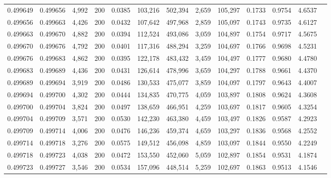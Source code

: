 \begin{tabular}{rrrrrrrrrrrrr}
0.499649 & 0.499656 &  4,992 & 200 &                                     0.0385 & 103,216 & 502,394 &   2,659 & 105,297 & 0.1733 & 0.9754 & 4.6537 \\
0.499656 & 0.499663 &  4,426 & 200 &                                     0.0432 & 107,642 & 497,968 &   2,859 & 105,097 & 0.1743 & 0.9735 & 4.6127 \\
0.499663 & 0.499670 &  4,882 & 200 &                                     0.0394 & 112,524 & 493,086 &   3,059 & 104,897 & 0.1754 & 0.9717 & 4.5675 \\
0.499670 & 0.499676 &  4,792 & 200 &                                     0.0401 & 117,316 & 488,294 &   3,259 & 104,697 & 0.1766 & 0.9698 & 4.5231 \\
0.499676 & 0.499683 &  4,862 & 200 &                                     0.0395 & 122,178 & 483,432 &   3,459 & 104,497 & 0.1777 & 0.9680 & 4.4780 \\
0.499683 & 0.499689 &  4,436 & 200 &                                     0.0431 & 126,614 & 478,996 &   3,659 & 104,297 & 0.1788 & 0.9661 & 4.4370 \\
0.499689 & 0.499694 &  3,919 & 200 &                                     0.0486 & 130,533 & 475,077 &   3,859 & 104,097 & 0.1797 & 0.9643 & 4.4007 \\
0.499694 & 0.499700 &  4,302 & 200 &                                     0.0444 & 134,835 & 470,775 &   4,059 & 103,897 & 0.1808 & 0.9624 & 4.3608 \\
0.499700 & 0.499704 &  3,824 & 200 &                                     0.0497 & 138,659 & 466,951 &   4,259 & 103,697 & 0.1817 & 0.9605 & 4.3254 \\
0.499704 & 0.499709 &  3,571 & 200 &                                     0.0530 & 142,230 & 463,380 &   4,459 & 103,497 & 0.1826 & 0.9587 & 4.2923 \\
0.499709 & 0.499714 &  4,006 & 200 &                                     0.0476 & 146,236 & 459,374 &   4,659 & 103,297 & 0.1836 & 0.9568 & 4.2552 \\
0.499714 & 0.499718 &  3,276 & 200 &                                     0.0575 & 149,512 & 456,098 &   4,859 & 103,097 & 0.1844 & 0.9550 & 4.2249 \\
0.499718 & 0.499723 &  4,038 & 200 &                                     0.0472 & 153,550 & 452,060 &   5,059 & 102,897 & 0.1854 & 0.9531 & 4.1874 \\
0.499723 & 0.499727 &  3,546 & 200 &                                     0.0534 & 157,096 & 448,514 &   5,259 & 102,697 & 0.1863 & 0.9513 & 4.1546 \\

\end{tabular}
